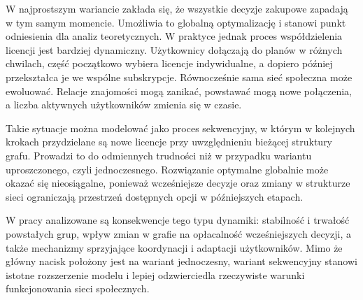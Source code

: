 W najprostszym wariancie zakłada się, że wszystkie decyzje zakupowe zapadają w tym samym momencie. Umożliwia to globalną optymalizację i stanowi punkt odniesienia dla analiz teoretycznych. W praktyce jednak proces współdzielenia licencji jest bardziej dynamiczny. Użytkownicy dołączają do planów w różnych chwilach, część początkowo wybiera licencje indywidualne, a dopiero później przekształca je we wspólne subskrypcje. Równocześnie sama sieć społeczna może ewoluować. Relacje znajomości mogą zanikać, powstawać mogą nowe połączenia, a liczba aktywnych użytkowników zmienia się w czasie.

Takie sytuacje można modelować jako proces sekwencyjny, w którym w kolejnych krokach przydzielane są nowe licencje przy uwzględnieniu bieżącej struktury grafu. Prowadzi to do odmiennych trudności niż w przypadku wariantu uproszczonego, czyli jednoczesnego. Rozwiązanie optymalne globalnie może okazać się nieosiągalne, ponieważ wcześniejsze decyzje oraz zmiany w strukturze sieci ograniczają przestrzeń dostępnych opcji w późniejszych etapach.

W pracy analizowane są konsekwencje tego typu dynamiki: stabilność i trwałość powstałych grup, wpływ zmian w grafie na opłacalność wcześniejszych decyzji, a także mechanizmy sprzyjające koordynacji i adaptacji użytkowników. Mimo że główny nacisk położony jest na wariant jednoczesny, wariant sekwencyjny stanowi istotne rozszerzenie modelu i lepiej odzwierciedla rzeczywiste warunki funkcjonowania sieci społecznych.
